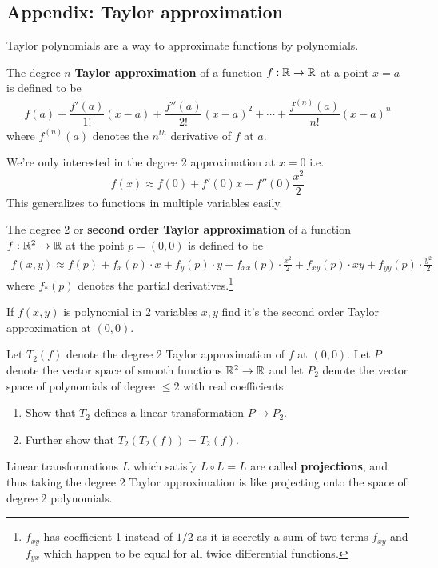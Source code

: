\subsection{Appendix: Taylor approximation}
Taylor polynomials are a way to approximate functions by polynomials.
\begin{definition}
	The degree $ n$ \textbf{Taylor approximation} of a function $ f: \mathbb{R} \rightarrow \mathbb{R}$ at a point $ x=a$ is defined to be
	\begin{align*}
		f(a) + \dfrac{f'(a)}{1!} (x-a) + \dfrac{f''(a)}{2!} (x-a)^2 + \cdots + \dfrac{f^{(n)}(a)}{n!} (x-a)^n
	\end{align*}
	where $f^{(n)}(a)$ denotes the $ n^{th}$ derivative of $ f$ at $ a$.
\end{definition}
We're only interested in the degree 2 approximation at $ x=0$ i.e. $$ f(x)
	\approx f(0) + f'(0) x + f''(0) \frac{x^2}{2}$$
This generalizes to functions in multiple variables easily.
\begin{definition}
	The degree 2 or \textbf{second order Taylor approximation} of a function $ f: \mathbb{R}^2 \rightarrow \mathbb{R}$ at the point $ p=(0,0)$ is defined to be
	\begin{align*}
		f(x,y) \approx f(p) + f_x(p)\cdot x + f_y(p)\cdot y + f_{xx}(p)\cdot \frac{x^2}{2} + f_{xy}(p) \cdot xy + f_{yy}(p)\cdot \frac{y^2}{2}
	\end{align*}
	where $f_{*}(p)$ denotes the partial derivatives.\footnote{$f_{xy}$ has coefficient 1 instead of $1/2$ as it is secretly a sum of two terms $f_{xy}$ and $f_{yx}$ which happen to be equal for all twice differential functions.}
\end{definition}
\begin{ques}
	If $ f(x,y)$ is polynomial in 2 variables $x,y$ find it's the second order Taylor approximation at $(0,0)$.
\end{ques}
\begin{ques}
  Let $T_2(f)$ denote the degree 2 Taylor approximation of $f$ at $(0,0)$. Let $P$ denote the vector space of smooth functions $\mathbb{R}^2 \rightarrow \mathbb{R}$ and let $P_2$ denote the vector space of polynomials of degree $\le 2$ with real coefficients.
  \begin{enumerate}
    \item Show that $T_2$ defines a linear transformation $P \rightarrow P_2$.
    \item Further show that $T_2(T_2(f)) = T_2(f)$.
  \end{enumerate}
\end{ques}
Linear transformations $L$ which satisfy $L \circ L = L$ are called \textbf{projections}, and thus taking the degree 2 Taylor approximation is like projecting onto the space of degree 2 polynomials.











